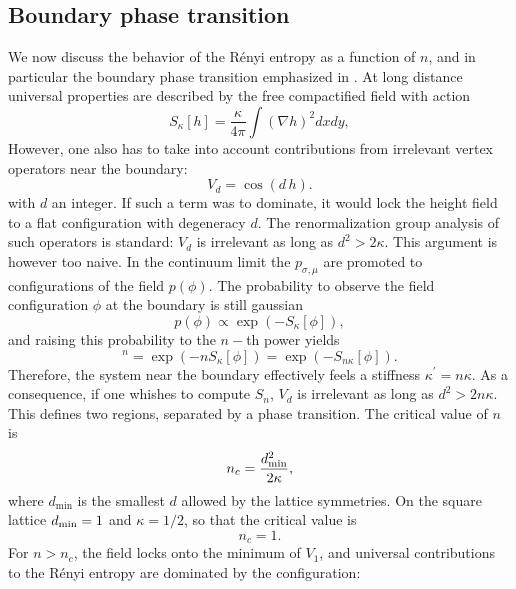 \documentclass[11pt]{iopart}
\begin{document}
\subsection{Boundary phase transition}
We now discuss the behavior of the R\'enyi entropy as a function of $n$, and in particular the boundary phase transition emphasized in \cite{Stephan11}. At long distance universal properties are described by the free compactified field with action
 \begin{equation}\label{eq:free_field_bis}
  S_\kappa[h]=\frac{\kappa}{4\pi}\int \left(\nabla h\right)^2 dx dy,
 \end{equation}
However, one also has to take into account contributions from irrelevant vertex operators near the boundary:
\begin{equation}
 V_d=\cos \left(d \,h\right).
\end{equation}
with $d$ an integer. If such a term was to dominate, it would lock the height field to a flat configuration with degeneracy $d$. The renormalization group analysis of such operators is standard\cite{Coleman}: $V_d$ is irrelevant as long as $d^2>2\kappa$. This argument is however too naive.  
In the continuum limit the $p_{\sigma,\mu}$ are promoted to configurations of the field $p(\phi)$. The probability to observe the field configuration $\phi$ at the boundary is still gaussian
\begin{equation}
 p(\phi)\propto \exp(-S_{\kappa}[\phi]),
\end{equation}
and raising this probability to the $n-$th power yields
\begin{equation}
 [p(\phi)]^n=\exp(-n S_{\kappa}[\phi])=\exp(-S_{n\kappa}[\phi]).
\end{equation}
Therefore, the system near the boundary effectively feels a stiffness $\kappa^\prime=n\kappa$. As a consequence, if one whishes to compute $S_n$, $V_d$ is irrelevant as long as $d^2>2n\kappa$. This defines two regions, separated by a phase transition. The critical value of $n$ is
\begin{equation}
 n_c=\frac{d_{\rm min}^2}{2\kappa},
\end{equation}
where $d_{\min}$ is the smallest $d$ allowed by the lattice symmetries. On the square lattice $d_{\rm min}=1$ and $\kappa=1/2$, so that the critical value is
\begin{equation}
 n_c=1.
\end{equation}
For $n>n_c$, the field locks onto the minimum of $V_{1}$, and universal contributions to the R\'enyi entropy are dominated by the configuration:
\end{document}
